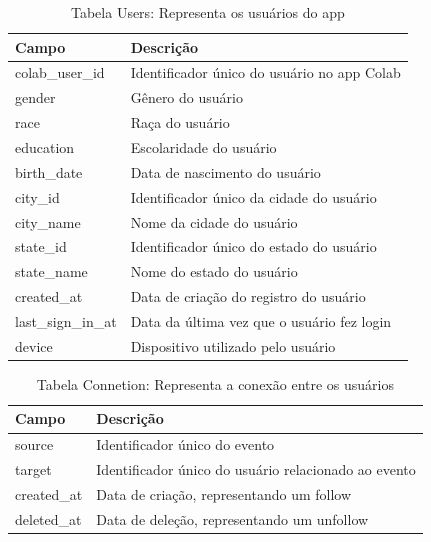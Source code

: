 \begin{table}[ht]
	\centering
	\caption{Tabela Users: Representa os usuários do app}
	\label{tab:user_model}
	\begin{tabularx}{\textwidth}{|l|X|}
		\hline
		\textbf{Campo}     & \textbf{Descrição}                          \\
		\hline
		colab\_user\_id    & Identificador único do usuário no app Colab \\
		gender             & Gênero do usuário                           \\
		race               & Raça do usuário                             \\
		education          & Escolaridade do usuário                     \\
		birth\_date        & Data de nascimento do usuário               \\
		city\_id           & Identificador único da cidade do usuário    \\
		city\_name         & Nome da cidade do usuário                   \\
		state\_id          & Identificador único do estado do usuário    \\
		state\_name        & Nome do estado do usuário                   \\
		created\_at        & Data de criação do registro do usuário      \\
		last\_sign\_in\_at & Data da última vez que o usuário fez login  \\
		device             & Dispositivo utilizado pelo usuário          \\
		\hline
	\end{tabularx}
\end{table}

\begin{table}[ht]
	\centering
	\caption{Tabela Connetion: Representa a conexão entre os usuários}
	\label{tab:connections_model}
	\begin{tabularx}{\textwidth}{|l|X|}
		\hline
		\textbf{Campo} & \textbf{Descrição}                                   \\
		\hline
		source         & Identificador único do evento                        \\
		target         & Identificador único do usuário relacionado ao evento \\
		created\_at    & Data de criação, representando um follow             \\
		deleted\_at    & Data de deleção, representando um unfollow           \\
		\hline
	\end{tabularx}
\end{table}

